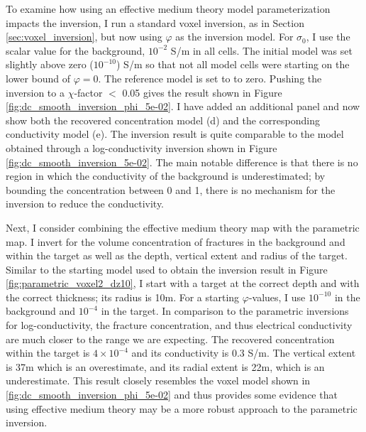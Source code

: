 

To examine how using an effective medium theory model parameterization impacts the inversion, I run a standard voxel inversion, as in Section \ref{sec:voxel_inversion}, but now using $\varphi$ as the inversion model. For $\sigma_0$, I use the scalar value for the background, $10^{-2}$ S/m in all cells. The initial model was set slightly above zero ($10^{-10}$) S/m so that not all model cells were starting on the lower bound of $\varphi=0$. The reference model is set to to zero. Pushing the inversion to a $\chi$-factor $<$ 0.05 gives the result shown in Figure \ref{fig:dc_smooth_inversion_phi_5e-02}. I have added an additional panel and now show both the recovered concentration model (d) and the corresponding conductivity model (e). The inversion result is quite comparable to the model obtained through a log-conductivity inversion shown in Figure \ref{fig:dc_smooth_inversion_5e-02}. The main notable difference is that there is no region in which the conductivity of the background is underestimated; by bounding the concentration between 0 and 1, there is no mechanism for the inversion to reduce the conductivity.




Next, I consider combining the effective medium theory map with the parametric map. I invert for the volume concentration of fractures in the background and within the target as well as the depth, vertical extent and radius of the target. Similar to the starting model used to obtain the inversion result in Figure \ref{fig:parametric_voxel2_dz10}, I start with a target at the correct depth and with the correct thickness; its radius is 10m. For a starting $\varphi$-values, I use $10^{-10}$ in the background and $10^{-4}$ in the target. In comparison to the parametric inversions for log-conductivity, the fracture concentration, and thus electrical conductivity are much closer to the range we are expecting. The recovered concentration within the target is $4\times10^{-4}$ and its conductivity is 0.3 S/m. The vertical extent is 37m which is an overestimate, and its radial extent is 22m, which is an underestimate. This result closely resembles the voxel model shown in \ref{fig:dc_smooth_inversion_phi_5e-02} and thus provides some evidence that using effective medium theory may be a more robust approach to the parametric inversion.




